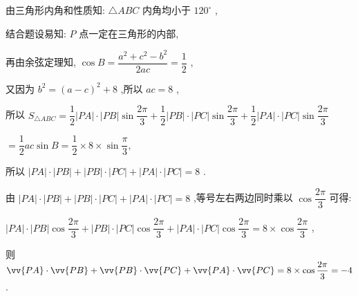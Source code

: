 \begin{enumerate}
\begin{jieda}
        由三角形内角和性质知: $\bigtriangleup {ABC}$ 内角均小于 ${120}^{ \circ  }$ ,
        
        结合题设易知: $P$ 点一定在三角形的内部,
        
        再由余弦定理知, $\cos B = \dfrac{{a}^{2} + {c}^{2} - {b}^{2}}{2ac} = \dfrac{1}{2}$ ,
        
        又因为 ${b}^{2} = {\left( a - c\right) }^{2} + 8$ ,所以 ${ac} = 8$ ,
        
        所以 ${S}_{\bigtriangleup {ABC}} = \dfrac{1}{2}\left| {PA}\right|  \cdot  \left| {PB}\right| \sin \dfrac{2\pi }{3} + \dfrac{1}{2}\left| {PB}\right|  \cdot  \left| {PC}\right| \sin \dfrac{2\pi }{3} + \dfrac{1}{2}\left| {PA}\right|  \cdot  \left| {PC}\right| \sin \dfrac{2\pi }{3}$
        
        $= \dfrac{1}{2}{ac}\sin B = \dfrac{1}{2} \times  8 \times  \sin \dfrac{\pi }{3},$
        
        所以 $\left| {PA}\right|  \cdot  \left| {PB}\right|  + \left| {PB}\right|  \cdot  \left| {PC}\right|  + \left| {PA}\right|  \cdot  \left| {PC}\right|  = 8$ .
        
        由 $\left| {PA}\right|  \cdot  \left| {PB}\right|  + \left| {PB}\right|  \cdot  \left| {PC}\right|  + \left| {PA}\right|  \cdot  \left| {PC}\right|  = 8$ ,等号左右两边同时乘以 $\cos \dfrac{2\pi }{3}$ 可得:
        
        $\left| {PA}\right|  \cdot  \left| {PB}\right| \cos \dfrac{2\pi }{3} + \left| {PB}\right|  \cdot  \left| {PC}\right| \cos \dfrac{2\pi }{3} + \left| {PA}\right|  \cdot  \left| {PC}\right| \cos \dfrac{2\pi }{3} = 8 \times  \cos \dfrac{2\pi }{3}$ ,
        
        则 $\vv{PA} \cdot  \vv{PB} + \vv{PB} \cdot  \vv{PC} + \vv{PA} \cdot  \vv{PC} = 8 \times  \cos \dfrac{2\pi }{3} =  - 4$ .
    \end{jieda}
\end{enumerate}